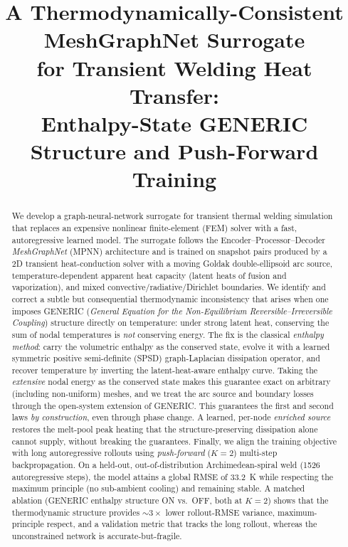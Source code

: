 \documentclass[11pt]{article}
\title{\bfseries A Thermodynamically-Consistent MeshGraphNet Surrogate\\[2pt]
       for Transient Welding Heat Transfer:\\[2pt]
       Enthalpy-State GENERIC Structure and Push-Forward Training}
\author{}
\date{}
\theoremstyle{definition}
\begin{document}
\maketitle

\begin{abstract}
\noindent
We develop a graph-neural-network surrogate for transient thermal welding
simulation that replaces an expensive nonlinear finite-element (FEM) solver with
a fast, autoregressive learned model. The surrogate follows the
Encoder--Processor--Decoder \emph{MeshGraphNet} (MPNN) architecture and is trained
on snapshot pairs produced by a 2D transient heat-conduction solver with a moving
Goldak double-ellipsoid arc source, temperature-dependent apparent heat capacity
(latent heats of fusion and vaporization), and mixed convective/radiative/Dirichlet
boundaries. We identify and correct a subtle but consequential
thermodynamic inconsistency that arises when one imposes GENERIC
(\emph{General Equation for the Non-Equilibrium Reversible--Irreversible Coupling})
structure directly on temperature: under strong latent heat, conserving the sum of
nodal temperatures is \emph{not} conserving energy. The fix is the classical
\emph{enthalpy method}: carry the volumetric enthalpy as the conserved state, evolve
it with a learned symmetric positive semi-definite (SPSD) graph-Laplacian dissipation
operator, and recover temperature by inverting the latent-heat-aware enthalpy curve.
Taking the \emph{extensive} nodal energy as the conserved state makes this guarantee
exact on arbitrary (including non-uniform) meshes, and we treat the arc source and
boundary losses through the open-system extension of GENERIC. This guarantees the first
and second laws \emph{by construction}, even through phase change. A learned, per-node \emph{enriched source} restores the melt-pool peak heating
that the structure-preserving dissipation alone cannot supply, without breaking the
guarantees. Finally, we align the training objective with long autoregressive
rollouts using \emph{push-forward} ($K{=}2$) multi-step backpropagation. On a
held-out, out-of-distribution Archimedean-spiral weld (\num{1526} autoregressive
steps), the model attains a global RMSE of \SI{33.2}{K} while respecting the maximum
principle (no sub-ambient cooling) and remaining stable. A matched ablation
(GENERIC enthalpy structure ON vs.\ OFF, both at $K{=}2$) shows that the thermodynamic
structure provides $\sim$$3\times$ lower rollout-RMSE variance, maximum-principle
respect, and a validation metric that tracks the long rollout, whereas the
unconstrained network is accurate-but-fragile.
\end{abstract}
\end{document}
